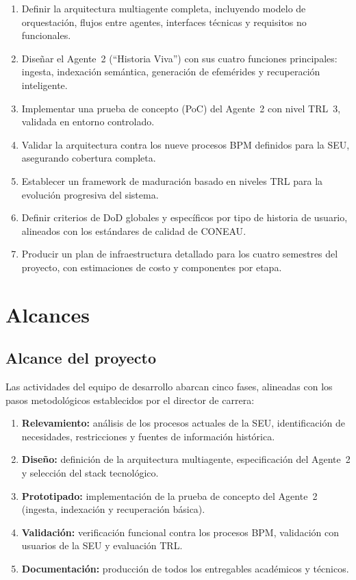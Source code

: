 \documentclass[a4paper, 12pt]{article}
\begin{document}
\begin{enumerate}[label=OE\arabic*.]
  \item Definir la arquitectura multiagente completa, incluyendo modelo de orquestaci\'on, flujos entre agentes, interfaces t\'ecnicas y requisitos no funcionales.
  \item Dise\~nar el Agente~2 (``Historia Viva'') con sus cuatro funciones principales: ingesta, indexaci\'on sem\'antica, generaci\'on de efem\'erides y recuperaci\'on inteligente.
  \item Implementar una prueba de concepto (PoC) del Agente~2 con nivel \ac{TRL}~3, validada en entorno controlado.
  \item Validar la arquitectura contra los nueve procesos \ac{BPM} definidos para la \ac{SEU}, asegurando cobertura completa.
  \item Establecer un framework de maduraci\'on basado en niveles \ac{TRL} para la evoluci\'on progresiva del sistema.
  \item Definir criterios de \ac{DoD} globales y espec\'ificos por tipo de historia de usuario, alineados con los est\'andares de calidad de \ac{CONEAU}.
  \item Producir un plan de infraestructura detallado para los cuatro semestres del proyecto, con estimaciones de costo y componentes por etapa.
\end{enumerate}

\section{Alcances}

\subsection{Alcance del proyecto}

Las actividades del equipo de desarrollo abarcan cinco fases, alineadas con los pasos metodol\'ogicos establecidos por el director de carrera:

\begin{enumerate}[label=\arabic*.]
  \item \textbf{Relevamiento:} an\'alisis de los procesos actuales de la \ac{SEU}, identificaci\'on de necesidades, restricciones y fuentes de informaci\'on hist\'orica.
  \item \textbf{Dise\~no:} definici\'on de la arquitectura multiagente, especificaci\'on del Agente~2 y selecci\'on del stack tecnol\'ogico.
  \item \textbf{Prototipado:} implementaci\'on de la prueba de concepto del Agente~2 (ingesta, indexaci\'on y recuperaci\'on b\'asica).
  \item \textbf{Validaci\'on:} verificaci\'on funcional contra los procesos \ac{BPM}, validaci\'on con usuarios de la \ac{SEU} y evaluaci\'on \ac{TRL}.
  \item \textbf{Documentaci\'on:} producci\'on de todos los entregables acad\'emicos y t\'ecnicos.
\end{enumerate}
\end{document}
